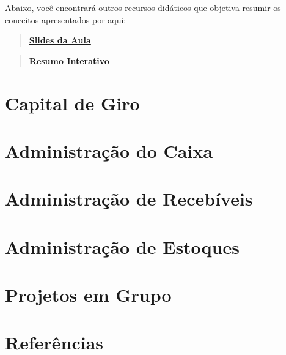 \documentclass[
  a4paper,
]{book}
\begin{document}
Abaixo, você encontrará outros recursos didáticos que objetiva resumir
os conceitos apresentados por aqui:

\begin{quote}
\href{./resources/intro-ppt.html}{\textbf{Slides da Aula}}
\end{quote}

\begin{quote}
\href{./resources/intro-interativo.html}{\textbf{Resumo Interativo}}
\end{quote}


\chapter{Capital de Giro}\label{sec-giro}


\chapter{Administração do Caixa}\label{sec-caixa}


\chapter{Administração de Recebíveis}\label{sec-credito}


\chapter{Administração de Estoques}\label{sec-estoque}


\chapter{Projetos em Grupo}\label{sec-aval}


\chapter*{Referências}\label{referuxeancias}

\end{document}
